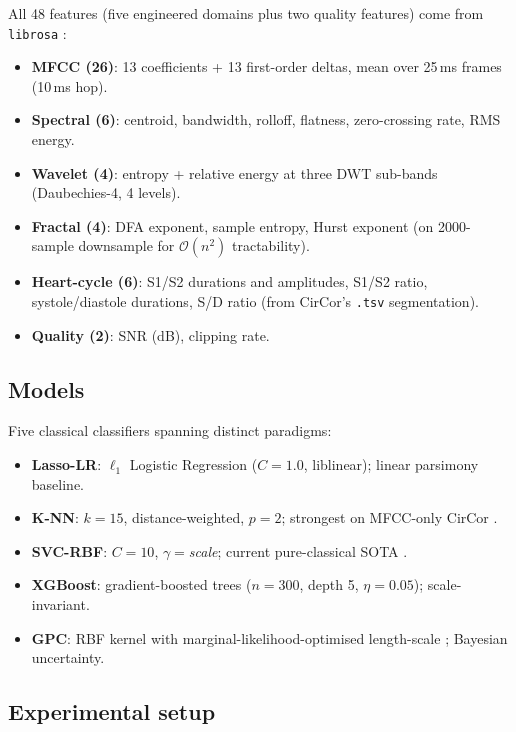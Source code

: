 \documentclass[10pt,twocolumn]{article}
\begin{document}
All 48 features (five engineered domains plus two quality features) come from \texttt{librosa} \citep{librosa2015}:
\begin{itemize}[leftmargin=*, itemsep=0.05em]
    \item \textbf{MFCC (26)}: 13 coefficients + 13 first-order deltas, mean over 25\,ms frames (10\,ms hop).
    \item \textbf{Spectral (6)}: centroid, bandwidth, rolloff, flatness, zero-crossing rate, RMS energy.
    \item \textbf{Wavelet (4)}: entropy + relative energy at three DWT sub-bands (Daubechies-4, 4 levels).
    \item \textbf{Fractal (4)}: DFA exponent, sample entropy, Hurst exponent (on 2000-sample downsample for $\mathcal{O}(n^2)$ tractability).
    \item \textbf{Heart-cycle (6)}: S1/S2 durations and amplitudes, S1/S2 ratio, systole/diastole durations, S/D ratio (from CirCor's \texttt{.tsv} segmentation).
    \item \textbf{Quality (2)}: SNR (dB), clipping rate.
\end{itemize}

\subsection{Models}

Five classical classifiers spanning distinct paradigms:
\begin{itemize}[leftmargin=*, itemsep=0.05em]
    \item \textbf{Lasso-LR}: $\ell_1$ Logistic Regression ($C=1.0$, liblinear); linear parsimony baseline.
    \item \textbf{K-NN}: $k=15$, distance-weighted, $p=2$; strongest on MFCC-only CirCor \citep{fuadah2023}.
    \item \textbf{SVC-RBF}: $C=10$, $\gamma=$\textit{scale}; current pure-classical SOTA \citep{wavelet2025}.
    \item \textbf{XGBoost}: gradient-boosted trees \citep{chen2016xgboost} ($n=300$, depth 5, $\eta=0.05$); scale-invariant.
    \item \textbf{GPC}: RBF kernel with marginal-likelihood-optimised length-scale \citep{rasmussen2006}; Bayesian uncertainty.
\end{itemize}

\subsection{Experimental setup}
\end{document}
